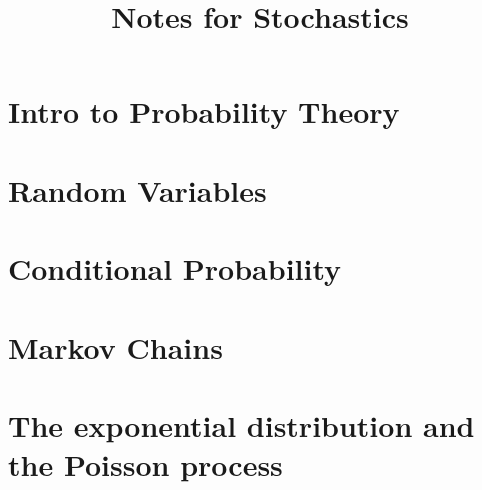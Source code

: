 \documentclass[10pt]{article}
\begin{document}
\title{Notes for Stochastics}

\section{Intro to Probability Theory}


\newpage

\section{Random Variables}


\newpage

\section{Conditional Probability}


\newpage

\section{Markov Chains}


\newpage
\section{The exponential distribution and the Poisson process}

\end{document}
